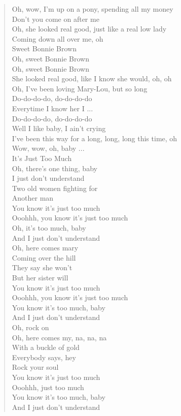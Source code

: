 \begin{verse}
Oh, wow, I'm up on a pony, spending all my money\\
Don't you come on after me\\
Oh, she looked real good, just like a real low lady\\
Coming down all over me, oh\\

Sweet Bonnie Brown\\
Oh, sweet Bonnie Brown\\
Oh, sweet Bonnie Brown\\
She looked real good, like I know she would, oh, oh\\

Oh, I've been loving Mary-Lou, but so long\\
Do-do-do-do, do-do-do-do\\
Everytime I know her I ...\\
Do-do-do-do, do-do-do-do\\
Well I like baby, I ain't crying\\
I've been this way for a long, long, long this time, oh\\
Wow, wow, oh, baby ...\\

It's Just Too Much\\

Oh, there's one thing, baby\\
I just don't understand\\
Two old women fighting for\\
Another man\\
You know it's just too much\\
Ooohhh, you know it's just too much\\
Oh, it's too much, baby\\
And I just don't understand\\

Oh, here comes mary\\
Coming over the hill\\
They say she won't\\
But her sister will\\
You know it's just too much\\
Ooohhh, you know it's just too much\\
You know it's too much, baby\\
And I just don't understand\\
Oh, rock on\\

Oh, here comes my, na, na, na\\
With a buckle of gold\\
Everybody says, hey\\
Rock your soul\\
You know it's just too much\\
Ooohhh, just too much\\
You know it's too much, baby\\
And I just don't understand\\


\end{verse}
